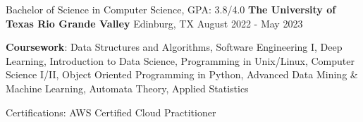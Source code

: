 
\begin{cventries}
  \cventry
    {Bachelor of Science in Computer Science, GPA: 3.8/4.0} %
    {\textbf{The University of Texas Rio Grande Valley}} %
    {Edinburg, TX} %
    {August 2022 - May 2023} %
    {
      \begin{cvitems} %
         \item {\textbf{Coursework}: Data Structures and Algorithms, Software Engineering I, Deep Learning, Introduction to Data Science, Programming in Unix/Linux, Computer Science I/II, Object Oriented Programming in Python, Advanced Data Mining \& Machine Learning, Automata Theory, Applied Statistics}
      \end{cvitems}
    }

\end{cventries}

\begin{cvawards}
  \cvaward
    {Certifications:} %
    {AWS Certified Cloud Practitioner } %

\end{cvawards}